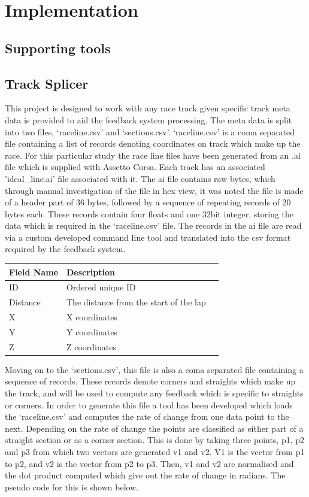 \section{Implementation}

\subsection{Supporting tools}

\subsection{Track Splicer}
This project is designed to work with any race track given specific track meta data is provided to aid the feedback system processing. The meta data is split into two files, ‘raceline.csv’ and ‘sections.csv’. ‘raceline.csv’ is a coma separated file containing a list of records denoting coordinates on track which make up the race. For this particular study the race line files have been generated from an .ai file which is supplied with Assetto Corsa. Each track has an associated 'ideal\_line.ai' file associated with it. The ai file contains raw bytes, which through manual investigation of the file in hex view, it was noted the file is made of a header part of 36 bytes, followed by a sequence of repeating records of 20 bytes each. These records contain four floats and one 32bit integer, storing the data which is required in the ‘raceline.csv’ file. The records in the ai file are read via a custom developed command line tool and translated into the csv format required by the feedback system. 	

\begin{center}
	\begin{tabular}{ | l | l | p{5cm} |}
		\hline
		Field Name & Description \\ \hline
		ID & Ordered unique ID \\ \hline
		Distance & The distance from the start of the lap \\ \hline
		X & X coordinates \\ \hline
		Y & Y coordinates \\ \hline
		Z & Z coordinates \\ \hline
	\end{tabular}
\end{center}

Moving on to the ‘sections.csv’, this file is also a coma separated file containing a sequence of records. These records denote corners and straights which make up the track, and will be used to compute any feedback which is specific to straights or corners. In order to generate this file a tool has been developed which loads the ‘raceline.csv’ and computes the rate of change from one data point to the next. Depending on the rate of change the points are classified as either part of a straight section or as a corner section. This is done by taking three points, p1, p2 and p3 from which two vectors are generated v1 and v2. V1 is the vector from p1 to p2, and v2 is the vector from p2 to p3. Then, v1 and v2 are normalised and the dot product computed which give out the rate of change in radians. The pseudo code for this is shown below.\\

